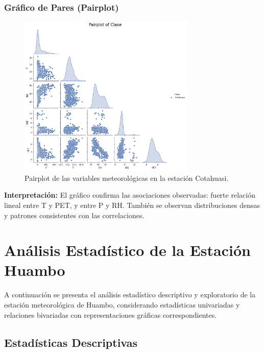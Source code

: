 \subsubsection*{Gráfico de Pares (Pairplot)}
\begin{figure}[htbp]
\centering
\includegraphics[width=0.75\textwidth]{resultados/por_estacion_meteorologica/Cotahuasi/pairplot.png}
\caption{Pairplot de las variables meteorológicas en la estación Cotahuasi.}
\label{fig:cotahuasi_pairplot}
\end{figure}
\textbf{Interpretación:} El gráfico confirma las asociaciones observadas: fuerte relación lineal entre T y PET, y entre P y RH. También se observan distribuciones densas y patrones consistentes con las correlaciones.




\section{Análisis Estadístico de la Estación Huambo}

A continuación se presenta el análisis estadístico descriptivo y exploratorio de la estación meteorológica de Huambo, considerando estadísticas univariadas y relaciones bivariadas con representaciones gráficas correspondientes.

\subsection{Estadísticas Descriptivas}

